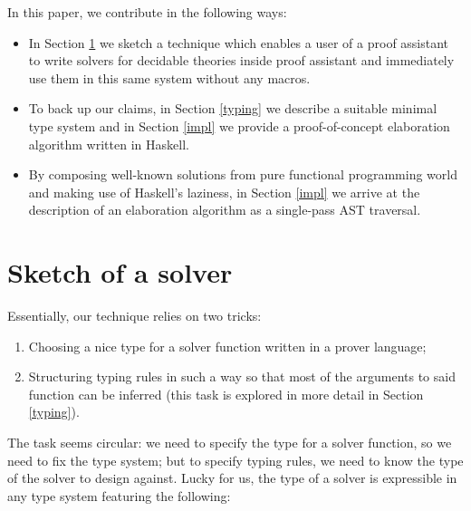 \documentclass[manuscript,screen,review]{acmart}
\begin{document}
In this paper, we contribute in the following ways:
\begin{itemize}
  \item In Section \ref{solver} we sketch a technique which enables a user of a
    proof assistant to write solvers for decidable theories inside proof
    assistant and immediately use them in this same system without any macros.
  \item To back up our claims, in Section \ref{typing} we describe a suitable
    minimal type system and in Section \ref{impl} we provide a proof-of-concept
    elaboration algorithm written in Haskell.
  \item By composing well-known solutions from pure functional programming world
    and making use of Haskell's laziness, in Section \ref{impl} we arrive at the
    description of an elaboration algorithm as a single-pass AST traversal.
\end{itemize}

\section{Sketch of a solver} \label{solver}

Essentially, our technique relies on two tricks:
\begin{enumerate}
  \item Choosing a nice type for a solver function written in a prover language;
  \item Structuring typing rules in such a way so that most of the arguments to
    said function can be inferred (this task is explored in more detail in
    Section \ref{typing}).
\end{enumerate}

The task seems circular: we need to specify the type for a solver function, so
we need to fix the type system; but to specify typing rules, we need to know the
type of the solver to design against. Lucky for us, the type of a solver is
expressible in any type system featuring the following:
\end{document}
